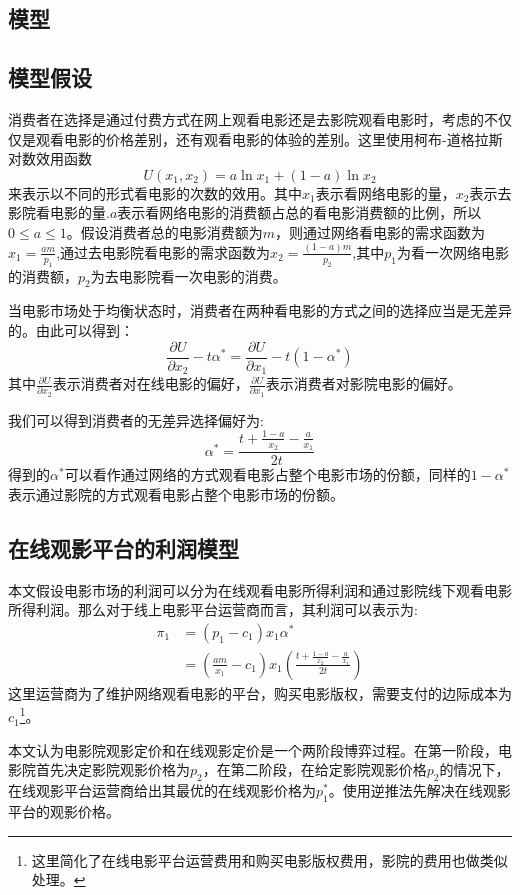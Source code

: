 \documentclass[paper=a4, fontsize=10.5pt]{scrartcl} %
\numberwithin{equation}{section} %
\numberwithin{figure}{section} %
\numberwithin{table}{section} %
\begin{document}
\begin{CJK}{UTF8}{gbsn}
\section{模型}
\subsection{模型假设}
消费者在选择是通过付费方式在网上观看电影还是去影院观看电影时，考虑的不仅仅是观看电影的价格差别，还有观看电影的体验的差别。这里使用柯布-道格拉斯对数效用函数$$U(x_1,x_2) = a \ln x_1 + (1-a) \ln x_2$$来表示以不同的形式看电影的次数的效用。其中$x_1$表示看网络电影的量，$x_2$表示去影院看电影的量.$a$表示看网络电影的消费额占总的看电影消费额的比例，所以$0 \le a \le 1$。假设消费者总的电影消费额为$m$，则通过网络看电影的需求函数为$x_1 = \frac{am}{p_1}$,通过去电影院看电影的需求函数为$x_2 = \frac{(1-a)m}{p_2}$,其中$p_1$为看一次网络电影的消费额，$p_2$为去电影院看一次电影的消费。

当电影市场处于均衡状态时，消费者在两种看电影的方式之间的选择应当是无差异的。由此可以得到：$$\frac{\partial U}{\partial x_2} - t\alpha^* =\frac{\partial U}{\partial x_1}  - t(1-\alpha^*)$$
其中$\frac{\partial U}{\partial x_2}$表示消费者对在线电影的偏好，$\frac{\partial U}{\partial x_1}$表示消费者对影院电影的偏好。

我们可以得到消费者的无差异选择偏好为:$$\alpha^*  = \frac{t+\frac{1-a}{x_2} -\frac{a}{x_1}}{2t}$$
得到的$\alpha^*$可以看作通过网络的方式观看电影占整个电影市场的份额，同样的$1-\alpha^*$表示通过影院的方式观看电影占整个电影市场的份额。

\subsection{在线观影平台的利润模型}
本文假设电影市场的利润可以分为在线观看电影所得利润和通过影院线下观看电影所得利润。那么对于线上电影平台运营商而言，其利润可以表示为:
\begin{equation*}
\begin{split}
\pi_1 
&= (p_1 - c_1)x_1\alpha^*\\
&= (\frac{am}{x_1} - c_1)x_1(\frac{t+\frac{1-a}{x_2} -\frac{a}{x_1}}{2t})
\end{split}
\end{equation*}
 这里运营商为了维护网络观看电影的平台，购买电影版权，需要支付的边际成本为$c_1$\footnote{这里简化了在线电影平台运营费用和购买电影版权费用，影院的费用也做类似处理。}。
 
本文认为电影院观影定价和在线观影定价是一个两阶段博弈过程。在第一阶段，电影院首先决定影院观影价格为$p_2$，在第二阶段，在给定影院观影价格$p_2$的情况下，在线观影平台运营商给出其最优的在线观影价格为$p_1^*$。使用逆推法先解决在线观影平台的观影价格。


\end{CJK}
\end{document}
